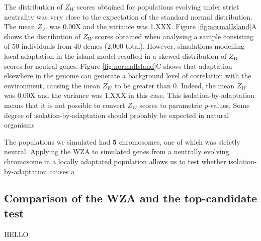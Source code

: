 \documentclass[11pt,twoside,lineno]{GSA_format}
\begin{document}
The distribution of $Z_W$ scores obtained for populations evolving under strict neutrality was very close to the expectation of the standard normal distribution. The mean $Z_W$ was 0.00X and the variance was 1.XXX. Figure \ref{fig:normalIsland}A shows the distribution of $Z_W$ scores obtained when analysing a sample consisting of 50 individuals from 40 demes (2,000 total).  However, simulations modelling local adaptation in the island model resulted in a skewed distribution of $Z_W$ scores for neutral genes. Figure \ref{fig:normalIsland}C shows that adaptation elsewhere in the genome can generate a background level of correlation with the environment, causing the mean $Z_W$ to be greater than 0. Indeed, the mean $Z_W$ was 0.00X and the variance was 1.XXX in this case. This isolation-by-adaptation means that it is not possible to convert $Z_W$ scores to parametric \textit{p}-values. 
Some degree of isolation-by-adaptation should probably be expected in natural organisms

The populations we simulated had \textbf{5} chromosomes, one of which was strictly neutral. Applying the WZA to simulated genes from a neutrally evolving chromosome in a locally adaptated population allows us to test whether isolation-by-adaptation causes a 





\subsection{Comparison of the WZA and the top-candidate test}

HELLO
\end{document}
